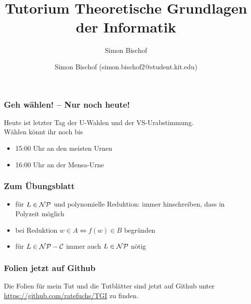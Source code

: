 \documentclass{beamer}
\author{Simon Bischof (simon.bischof2@student.kit.edu)}
\title{Tutorium Theoretische Grundlagen der Informatik}
\subtitle{Simon Bischof}
\institute{Institut f\"{u}r Kryptographie und Sicherheit}
\newcommand{\NP}{\ensuremath \mathcal{NP}}
\newcommand{\NPC}{\ensuremath \mathcal{NP-C}}
\begin{document}
\begin{frame}
\maketitle
\end{frame}

\begin{frame}
\frametitle{\LARGE Geh wählen! -- Nur noch heute!}
Heute ist letzter Tag der U-Wahlen und der VS-Urabstimmung.\\
Wählen könnt ihr noch bis
\begin{itemize}
\item 15:00 Uhr an den meisten Urnen
\item 16:00 Uhr an der Mensa-Urne
\end{itemize}
\end{frame}

\begin{frame}
\frametitle{Zum Übungsblatt}
\begin{itemize}
\item für $L\in\NP$ und polynomielle Reduktion: immer hinschreiben, dass in Polyzeit möglich
\item bei Reduktion $w\in A\Leftrightarrow f(w)\in B$ begründen
\item für $L\in\NPC$ immer auch $L\in\NP$ nötig
\end{itemize}
\end{frame}

\begin{frame}
\frametitle{Folien jetzt auf Github}
Die Folien für mein Tut und die Tutblätter sind jetzt auf Github unter\\
\textcolor{blue}{\underline{\url{https://github.com/ratefuchs/TGI}}} zu finden.
\end{frame}
\end{document}
